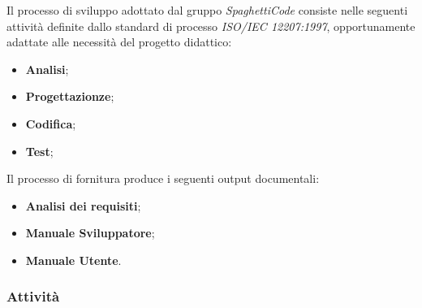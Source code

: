 Il processo di sviluppo adottato dal gruppo \emph{SpaghettiCode} consiste nelle seguenti attività definite dallo standard di processo \emph{ISO/IEC 12207:1997}, opportunamente adattate alle necessità del progetto didattico:
\begin{itemize}
	\item \textbf{Analisi};
	\item \textbf{Progettazionze};
    \item \textbf{Codifica};
    \item \textbf{Test};
\end{itemize}
Il processo di fornitura produce i seguenti output documentali:
\begin{itemize}
    \item \textbf{Analisi dei requisiti};
    \item \textbf{Manuale Sviluppatore};
	\item \textbf{Manuale Utente}.
\end{itemize}

\subsubsection{Attività}

